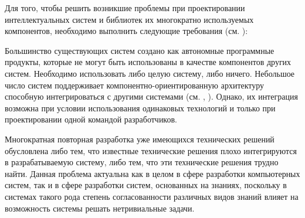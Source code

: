 Для того, чтобы решить возникшие проблемы при проектировании интеллектуальных систем и библиотек их многократно используемых компонентов, необходимо выполнить следующие требования (см. ):
\begin{SCn}
\begin{scnindent}
	\begin{scneqtovector}
	\end{scneqtovector}
\end{scnindent}
\end{SCn}

Большинство существующих систем создано как автономные программные продукты, которые не могут быть использованы в качестве компонентов других систем. Необходимо использовать либо целую систему, либо ничего. Небольшое число систем поддерживает компонентно-ориентированную архитектуру способную интегрироваться с другими системами (см. , ). Однако, их интеграция возможна при условии использования одинаковых технологий и только при проектировании одной командой разработчиков.

Многократная повторная разработка уже имеющихся технических решений обусловлена либо тем, что известные технические решения плохо интегрируются в разрабатываемую систему, либо тем, что эти технические решения трудно найти. Данная проблема актуальна как в целом в сфере разработки компьютерных систем, так и в сфере разработки систем, основанных на знаниях, поскольку в системах такого рода степень согласованности различных видов знаний влияет на возможность системы решать нетривиальные задачи.

